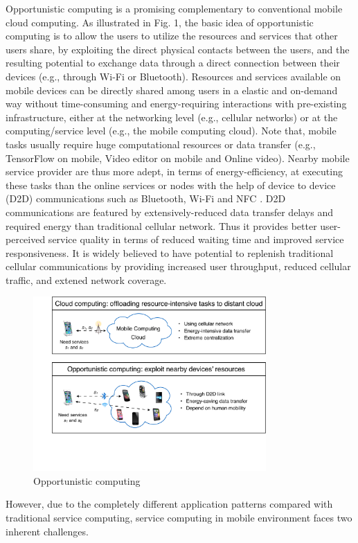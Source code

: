 \documentclass[journal]{IEEEtran}
\begin{document}
Opportunistic computing is a promising complementary to conventional mobile cloud computing. As illustrated in Fig. 1, the basic idea of opportunistic computing is to allow the users to utilize the resources and services that other users share, by exploiting the direct physical contacts between the users, and the resulting potential to exchange data through a direct connection between their devices (e.g., through Wi-Fi or Bluetooth). Resources and services available on mobile devices can be directly shared among users in a elastic and on-demand way without time-consuming and energy-requiring interactions with pre-existing infrastructure, either at the networking level (e.g., cellular networks) or at the computing/service level (e.g., the mobile computing cloud). 
Note that, mobile tasks usually require huge computational resources or data transfer (e.g., TensorFlow on mobile, Video editor on mobile and Online video). Nearby mobile service provider are thus more adept, in terms of energy-efficiency, at executing these tasks than the online services or nodes with the help of device to device (D2D) communications such as Bluetooth, Wi-Fi and NFC \cite{balani2007energy}. D2D communications are featured by extensively-reduced data transfer delays and required energy than traditional cellular network. Thus it provides better user-perceived service quality in terms of reduced waiting time and improved service responsiveness. It is widely believed to have potential to replenish traditional cellular communications by providing increased user throughput, reduced cellular traffic, and extened network coverage.

\begin{figure}[!t]
\centering
\includegraphics[width=3.5in]{./img/pic1.pdf}
\caption{Opportunistic computing}
\label{Opportunistic computing}
\end{figure}

However, due to the completely different application patterns compared with traditional service computing, service computing in mobile environment faces two inherent challenges.
\end{document}
